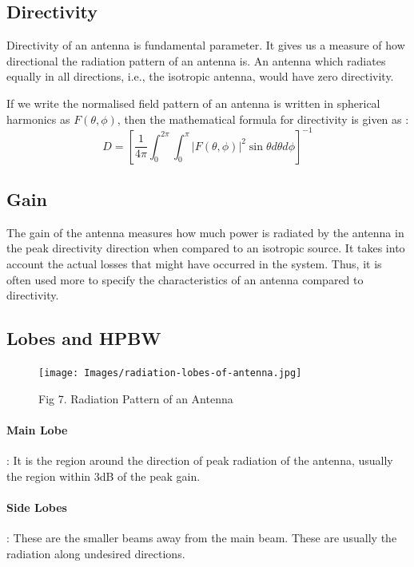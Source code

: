 \documentclass[12pt]{article}
\begin{document}
\subsection{Directivity}
Directivity of an antenna is fundamental parameter. It gives us a measure of how directional the radiation pattern of an antenna is. \linebreak 
An antenna which radiates equally in all directions, i.e., the isotropic antenna, would have zero directivity.\linebreak

If we write the normalised field pattern of an antenna is written in spherical harmonics as $F(\theta, \phi)$, then the mathematical formula for directivity is given as :
\begin{equation}
  D = \left[ \dfrac{1}{4\pi}\int^{2\pi}_0 \int^{\pi}_0 |F(\theta, \phi)|^2 \sin\theta d\theta d\phi \right]^{-1}
\end{equation}
\subsection{Gain}
The gain of the antenna measures how much power is radiated by the antenna in the peak directivity direction when compared to an isotropic source. \linebreak
It takes into account the actual losses that might have occurred in the system. Thus, it is often used more to specify the characteristics of an antenna compared to directivity.
\subsection{Lobes and HPBW}
\begin{figure}[H]
  \centering
  \texttt{[image: Images/radiation-lobes-of-antenna.jpg]}
  \caption{Fig 7. Radiation Pattern of an Antenna}
\end{figure}
\paragraph{Main Lobe} : It is the region around the direction of peak radiation of the antenna, usually the region within 3dB of the peak gain.
\paragraph{Side Lobes} : These are the smaller beams away from the main beam. These are usually the radiation along undesired directions. 
\end{document}
